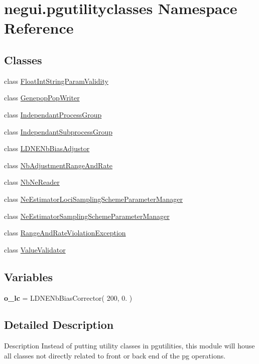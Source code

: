 \hypertarget{namespacenegui_1_1pgutilityclasses}{}\section{negui.\+pgutilityclasses Namespace Reference}
\label{namespacenegui_1_1pgutilityclasses}
\subsection*{Classes}
\begin{DoxyCompactItemize}
\item 
class \hyperlink{classnegui_1_1pgutilityclasses_1_1FloatIntStringParamValidity}{Float\+Int\+String\+Param\+Validity}
\item 
class \hyperlink{classnegui_1_1pgutilityclasses_1_1GenepopPopWriter}{Genepop\+Pop\+Writer}
\item 
class \hyperlink{classnegui_1_1pgutilityclasses_1_1IndependantProcessGroup}{Independant\+Process\+Group}
\item 
class \hyperlink{classnegui_1_1pgutilityclasses_1_1IndependantSubprocessGroup}{Independant\+Subprocess\+Group}
\item 
class \hyperlink{classnegui_1_1pgutilityclasses_1_1LDNENbBiasAdjustor}{L\+D\+N\+E\+Nb\+Bias\+Adjustor}
\item 
class \hyperlink{classnegui_1_1pgutilityclasses_1_1NbAdjustmentRangeAndRate}{Nb\+Adjustment\+Range\+And\+Rate}
\item 
class \hyperlink{classnegui_1_1pgutilityclasses_1_1NbNeReader}{Nb\+Ne\+Reader}
\item 
class \hyperlink{classnegui_1_1pgutilityclasses_1_1NeEstimatorLociSamplingSchemeParameterManager}{Ne\+Estimator\+Loci\+Sampling\+Scheme\+Parameter\+Manager}
\item 
class \hyperlink{classnegui_1_1pgutilityclasses_1_1NeEstimatorSamplingSchemeParameterManager}{Ne\+Estimator\+Sampling\+Scheme\+Parameter\+Manager}
\item 
class \hyperlink{classnegui_1_1pgutilityclasses_1_1RangeAndRateViolationException}{Range\+And\+Rate\+Violation\+Exception}
\item 
class \hyperlink{classnegui_1_1pgutilityclasses_1_1ValueValidator}{Value\+Validator}
\end{DoxyCompactItemize}
\subsection*{Variables}
\begin{DoxyCompactItemize}
\item 
{\bfseries o\+\_\+lc} = L\+D\+N\+E\+Nb\+Bias\+Corrector( 200, 0. )\hypertarget{namespacenegui_1_1pgutilityclasses_a97f7c1757723072607dd51f6cd8356a7}{}\label{namespacenegui_1_1pgutilityclasses_a97f7c1757723072607dd51f6cd8356a7}

\end{DoxyCompactItemize}


\subsection{Detailed Description}
\begin{DoxyVerb}Description
Instead of putting utility classes in pgutilities,
this module will house all classes not directly related
to front or back end of the pg operations.
\end{DoxyVerb}
 